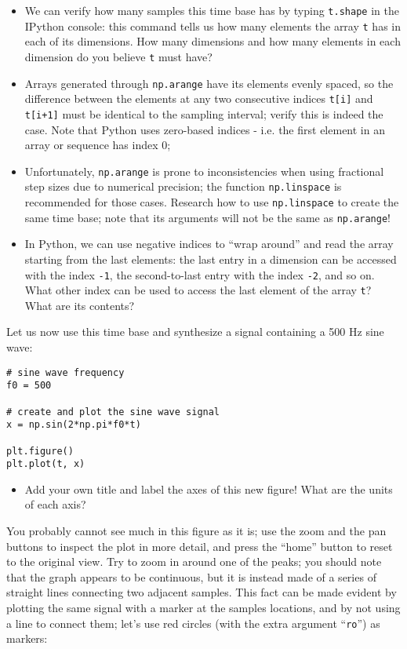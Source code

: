 \begin{itemize}
	\item We can verify how many samples this time base has by typing {\tt t.shape} in the IPython console: this command tells us how many elements the array {\tt t} has in each of its dimensions. How many dimensions and how many elements in each dimension do you believe {\tt t} must have?
	\item Arrays generated through {\tt np.arange} have its elements evenly spaced, so the difference between the elements at any two consecutive indices {\tt t[i]} and {\tt t[i+1]} must be identical to the sampling interval; verify this is indeed the case. Note that Python uses zero-based indices - i.e. the first element in an array or sequence has index 0;
	\item Unfortunately, {\tt np.arange} is prone to inconsistencies when using fractional step sizes due to numerical precision; the function {\tt np.linspace} is recommended for those cases. Research how to use {\tt np.linspace} to create the same time base; note that its arguments will not be the same as {\tt np.arange}!
	\item In Python, we can use negative indices to ``wrap around'' and read the array starting from the last elements: the last entry in a dimension can be accessed with the index {\tt -1}, the second-to-last entry with the index {\tt -2}, and so on. What other index can be used to access the last element of the array {\tt t}? What are its contents?
\end{itemize}

Let us now use this time base and synthesize a signal containing a 500 Hz sine wave:

\begin{lstlisting}[frame=single]
# sine wave frequency
f0 = 500

# create and plot the sine wave signal
x = np.sin(2*np.pi*f0*t)

plt.figure()
plt.plot(t, x)
\end{lstlisting}

\begin{itemize}
	\item Add your own title and label the axes of this new figure! What are the units of each axis?
\end{itemize}

You probably cannot see much in this figure as it is; use the zoom and the pan buttons to inspect the plot in more detail, and press the ``home'' button to reset to the original view. Try to zoom in around one of the peaks; you should note that the graph appears to be continuous, but it is instead made of a series of straight lines connecting two adjacent samples. This fact can be made evident by plotting the same signal with a marker at the samples locations, and by not using a line to connect them; let's use red circles (with the extra argument ``{\tt ro}'') as markers:


